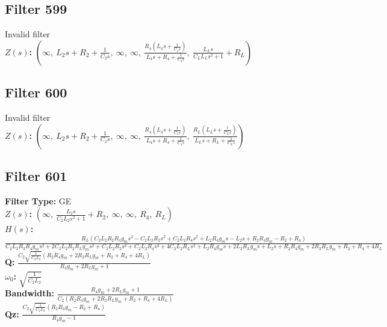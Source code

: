 \documentclass{article}
\begin{document}
\subsection*{Filter 599}
Invalid filter \\ 
\textbf{$Z(s)$:} $\left( \infty, \  L_{2} s + R_{2} + \frac{1}{C_{2} s}, \  \infty, \  \infty, \  \frac{R_{4} \left(L_{4} s + \frac{1}{C_{4} s}\right)}{L_{4} s + R_{4} + \frac{1}{C_{4} s}}, \  \frac{L_{L} s}{C_{L} L_{L} s^{2} + 1} + R_{L}\right)$ \\ 
\subsection*{Filter 600}
Invalid filter \\ 
\textbf{$Z(s)$:} $\left( \infty, \  L_{2} s + R_{2} + \frac{1}{C_{2} s}, \  \infty, \  \infty, \  \frac{R_{4} \left(L_{4} s + \frac{1}{C_{4} s}\right)}{L_{4} s + R_{4} + \frac{1}{C_{4} s}}, \  \frac{R_{L} \left(L_{L} s + \frac{1}{C_{L} s}\right)}{L_{L} s + R_{L} + \frac{1}{C_{L} s}}\right)$ \\ 
\subsection*{Filter 601}
\textbf{Filter Type:} GE \\ 
\textbf{$Z(s)$:} $\left( \infty, \  \frac{L_{2} s}{C_{2} L_{2} s^{2} + 1} + R_{2}, \  \infty, \  \infty, \  R_{4}, \  R_{L}\right)$ \\ 
\textbf{$H(s)$:} $\frac{R_{L} \left(C_{2} L_{2} R_{2} R_{4} g_{m} s^{2} - C_{2} L_{2} R_{2} s^{2} + C_{2} L_{2} R_{4} s^{2} + L_{2} R_{4} g_{m} s - L_{2} s + R_{2} R_{4} g_{m} - R_{2} + R_{4}\right)}{C_{2} L_{2} R_{2} R_{4} g_{m} s^{2} + 2 C_{2} L_{2} R_{2} R_{L} g_{m} s^{2} + C_{2} L_{2} R_{2} s^{2} + C_{2} L_{2} R_{4} s^{2} + 4 C_{2} L_{2} R_{L} s^{2} + L_{2} R_{4} g_{m} s + 2 L_{2} R_{L} g_{m} s + L_{2} s + R_{2} R_{4} g_{m} + 2 R_{2} R_{L} g_{m} + R_{2} + R_{4} + 4 R_{L}}$ \\ 
\textbf{Q:} $\frac{C_{2} \sqrt{\frac{1}{C_{2} L_{2}}} \left(R_{2} R_{4} g_{m} + 2 R_{2} R_{L} g_{m} + R_{2} + R_{4} + 4 R_{L}\right)}{R_{4} g_{m} + 2 R_{L} g_{m} + 1}$ \\ 
\textbf{$\omega_0$:} $\sqrt{\frac{1}{C_{2} L_{2}}}$ \\ 
\textbf{Bandwidth:} $\frac{R_{4} g_{m} + 2 R_{L} g_{m} + 1}{C_{2} \left(R_{2} R_{4} g_{m} + 2 R_{2} R_{L} g_{m} + R_{2} + R_{4} + 4 R_{L}\right)}$ \\ 
\textbf{Qz:} $\frac{C_{2} \sqrt{\frac{1}{C_{2} L_{2}}} \left(R_{2} R_{4} g_{m} - R_{2} + R_{4}\right)}{R_{4} g_{m} - 1}$ \\ 
\end{document}
